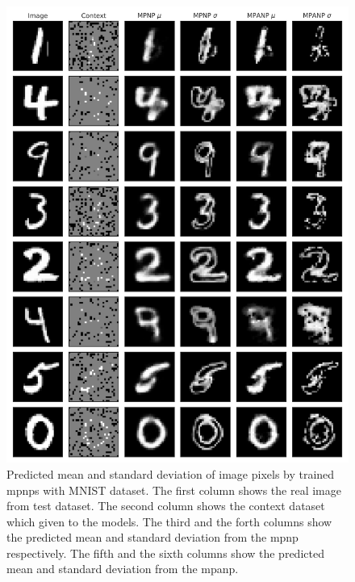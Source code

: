 \begin{figure}[t]
    \centering
    \includegraphics[width = \textwidth]{figure/app_visualize_mnist.pdf}
    \caption{Predicted mean and standard deviation of image pixels by trained \glspl{mpnp} with MNIST dataset. The first column shows the real image from test dataset. The second column shows the context dataset which given to the models. The third and the forth columns show the predicted mean and standard deviation from the \gls{mpnp} respectively. The fifth and the sixth columns show the predicted mean and standard deviation from the \gls{mpanp}.} 
    \label{figure/app_visualize_mnist}
\end{figure}

